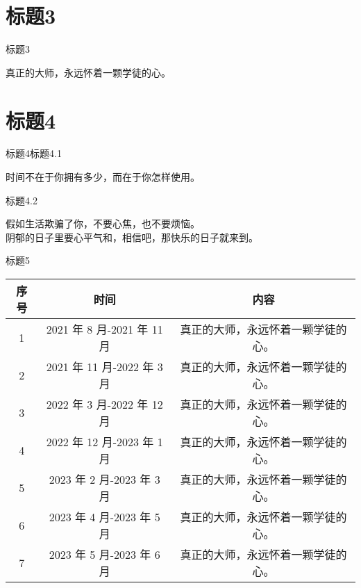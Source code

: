 \documentclass{otherloads/styles/ppt-xju-blue}
\begin{document}
	
	
\section{标题3}
		
	\begin{frame}[t]{标题3}
		
		\begin{center}			
			真正的大师，永远怀着一颗学徒的心。
		\end{center}
	
	\end{frame}
	
	


\section{标题4}

	\begin{frame}[t]{标题4}{标题4.1}
		
		\begin{center}
			时间不在于你拥有多少，而在于你怎样使用。
		\end{center}
		
	\end{frame}
	
	
	\begin{frame}[t]{标题4.2}
		
		假如生活欺骗了你，不要心焦，也不要烦恼。\\[6pt]
		阴郁的日子里要心平气和，相信吧，那快乐的日子就来到。

	\end{frame}
	
	


	
	\begin{frame}[t]{标题5}
		
		\begin{center}
			\begin{tabular}{|c|c|c|}
				\hline 序号&时间&内容\\
				\hline 1&2021 年 8 月-2021 年 11 月&真正的大师，永远怀着一颗学徒的心。\\
				\hline 2&2021 年 11 月-2022 年 3 月&真正的大师，永远怀着一颗学徒的心。\\
				\hline 3&2022 年 3 月-2022 年 12 月&真正的大师，永远怀着一颗学徒的心。\\
				\hline 4&2022 年 12 月-2023 年 1 月&真正的大师，永远怀着一颗学徒的心。\\
				\hline 5&2023 年 2 月-2023 年 3 月&真正的大师，永远怀着一颗学徒的心。\\
				\hline 6&2023 年 4 月-2023 年 5 月&真正的大师，永远怀着一颗学徒的心。\\
				\hline 7&2023 年 5 月-2023 年 6 月 &真正的大师，永远怀着一颗学徒的心。\\
				\hline
			\end{tabular}
		\end{center}
	
	\end{frame}
	
\end{document}
